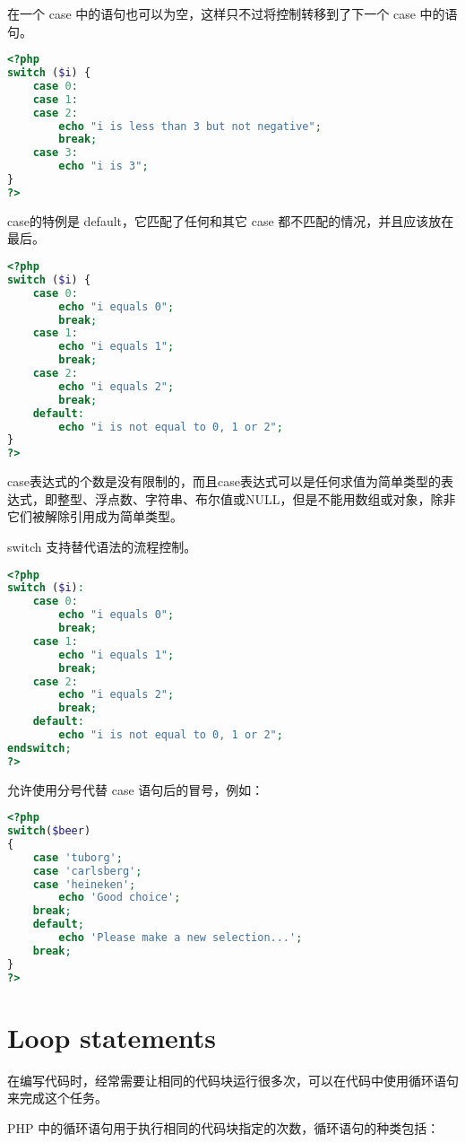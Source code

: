 在一个 case 中的语句也可以为空，这样只不过将控制转移到了下一个 case 中的语句。

\begin{lstlisting}[language=PHP]
<?php
switch ($i) {
    case 0:
    case 1:
    case 2:
        echo "i is less than 3 but not negative";
        break;
    case 3:
        echo "i is 3";
}
?>
\end{lstlisting}


case的特例是 default，它匹配了任何和其它 case 都不匹配的情况，并且应该放在最后。

\begin{lstlisting}[language=PHP]
<?php
switch ($i) {
    case 0:
        echo "i equals 0";
        break;
    case 1:
        echo "i equals 1";
        break;
    case 2:
        echo "i equals 2";
        break;
    default:
        echo "i is not equal to 0, 1 or 2";
}
?>
\end{lstlisting}

case表达式的个数是没有限制的，而且case表达式可以是任何求值为简单类型的表达式，即整型、浮点数、字符串、布尔值或NULL，但是不能用数组或对象，除非它们被解除引用成为简单类型。

switch 支持替代语法的流程控制。

\begin{lstlisting}[language=PHP]
<?php
switch ($i):
    case 0:
        echo "i equals 0";
        break;
    case 1:
        echo "i equals 1";
        break;
    case 2:
        echo "i equals 2";
        break;
    default:
        echo "i is not equal to 0, 1 or 2";
endswitch;
?>
\end{lstlisting}


允许使用分号代替 case 语句后的冒号，例如：

\begin{lstlisting}[language=PHP]
<?php
switch($beer)
{
    case 'tuborg';
    case 'carlsberg';
    case 'heineken';
        echo 'Good choice';
    break;
    default;
        echo 'Please make a new selection...';
    break;
}
?>
\end{lstlisting}

\section{Loop statements}



在编写代码时，经常需要让相同的代码块运行很多次，可以在代码中使用循环语句来完成这个任务。


PHP 中的循环语句用于执行相同的代码块指定的次数，循环语句的种类包括：


